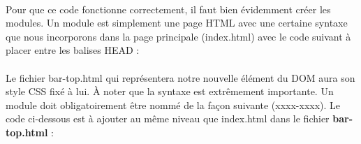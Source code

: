 \documentclass{article}
\begin{document}
\vspace{0.5cm}\\
Pour que ce code fonctionne correctement, il faut bien \'evidemment cr\'eer les modules. Un module est simplement une page HTML avec une certaine syntaxe que nous incorporons dans la page principale (index.html) avec le code suivant \`a placer entre les balises HEAD :
\vspace{0.5cm}\\
\vspace{0.5cm}\\

Le fichier bar-top.html qui repr\'esentera notre nouvelle \'el\'ement du DOM aura son style CSS fix\'e \`a lui. \`A noter que la syntaxe est extr\^emement importante. Un module doit obligatoirement \^etre nomm\'e de la fa\c{c}on suivante (xxxx-xxxx). Le code ci-dessous est \`a ajouter au m\^eme niveau que index.html dans le fichier \textbf{bar-top.html} :
\vspace{0.5cm}\\
\end{document}
